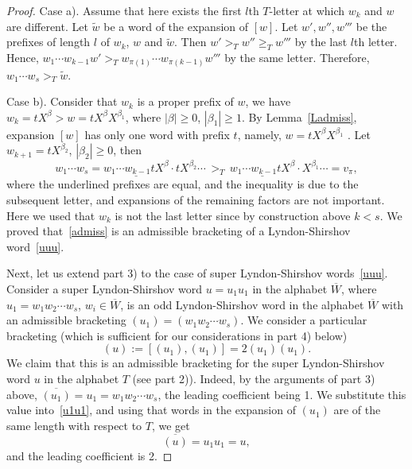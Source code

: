 \documentclass[12pt, reqno]{amsart}
\theoremstyle{remark}
\theoremstyle{definition}
\def\b{\beta}
\numberwithin{equation}{section}
\begin{document}
\begin{proof}
Case a). Assume that here exists the first $l$th $T$-letter at which   $w_k$ and $w$  are different. Let $\widetilde w$ be a word of the expansion of $[w]$.
Let $w',w'',w'''$ be the prefixes of length  $l$ of  $w_k$, $w$ and $\widetilde w$.
Then  $w'>_{T} w''\ge_{T} w'''$ by the last $l$th letter. Hence,
$w_1\cdots w_{k-1}w'>_{T} w_{\pi(1)}\cdots w_{\pi{(k-1)}} w'''$ by the same letter. Therefore, 
$w_1\cdots w_s>_T\widetilde w$. %

Case b). Consider that $w_k$  is a proper prefix of $w$, we have
$w_k=t X^\b> w= t X^\b X^{\b_1}$,  where $|\b|\ge 0$, $|\b_1|\ge 1 $.
By Lemma~\ref{Ladmiss},  expansion $[w]$ has only one word with prefix $t$, namely, $w=tX^\b X^{\b_1}$ . Let $w_{k+1}=tX^{\b_2}$, $|\b_2|\ge  0$, then
$$
w_1\cdots w_s=\underline{w_1\cdots w_{k-1} tX^\b}\cdot tX^{\b_2}\cdots \, >_{T}\,
\underline{w_1\cdots w_{k-1}t X^\b}\cdot X^{\b_1}\cdots=v_\pi,
$$
where the underlined prefixes are equal, and the inequality is due to the subsequent letter, and expansions of the remaining factors are not important.
Here we used that $w_k$ is not the last letter  since by construction above  $k<s$.
We proved that~\eqref{admiss} is an admissible bracketing of a Lyndon-Shirshov word~\eqref{uuu}.


Next, let  us extend part 3) to the case of super Lyndon-Shirshov words~\eqref{uuu}. 
Consider a super Lyndon-Shirshov word $u=u_1u_1$ in the alphabet $\overline W$, 
where $u_1=w_1w_2\cdots w_s$, $w_i\in \overline W$, is an odd Lyndon-Shirshov word in the alphabet $\overline W$  
with an admissible bracketing  $(u_1)=(w_1w_2\cdots w_s)$.
We consider a particular bracketing (which is sufficient for our considerations in part 4) below)
\begin{equation}\label{u1u1} 
(u) := [ (u_1), (u_1)] = 2 (u_1) (u_1).
\end{equation}
We claim that this is an admissible bracketing for the super Lyndon-Shirshov word $u$ in the alphabet $T$ (see part 2)).
Indeed, by the arguments of part 3) above, $\overline {(u_1)}=u_1=w_1w_2\cdots w_s$, the leading coefficient being 1. 
We substitute this value into~\eqref{u1u1}, and using that words in the expansion of $(u_1)$ are of the same length with respect to $T$, we get
$$ \overline{(u)}=u_1u_1= u,$$
and the leading coefficient is 2.



\end{proof}
\end{document}
